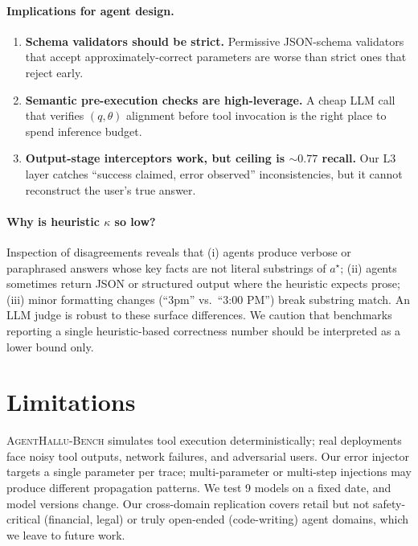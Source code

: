 \documentclass[11pt]{article}
\newcommand{\halluben}{\textsc{AgentHallu-Bench}}
\begin{document}
\paragraph{Implications for agent design.}
\begin{enumerate}
  \item \textbf{Schema validators should be strict.} Permissive JSON-schema validators that accept approximately-correct parameters are worse than strict ones that reject early.
  \item \textbf{Semantic pre-execution checks are high-leverage.} A cheap LLM call that verifies $(q, \theta)$ alignment before tool invocation is the right place to spend inference budget.
  \item \textbf{Output-stage interceptors work, but ceiling is $\sim\!0.77$ recall.} Our L3 layer catches ``success claimed, error observed'' inconsistencies, but it cannot reconstruct the user's true answer.
\end{enumerate}

\paragraph{Why is heuristic $\kappa$ so low?}
Inspection of disagreements reveals that (i) agents produce verbose or paraphrased answers whose key facts are not literal substrings of $a^\star$; (ii) agents sometimes return JSON or structured output where the heuristic expects prose; (iii) minor formatting changes (``3pm'' vs.\ ``3:00 PM'') break substring match. An LLM judge is robust to these surface differences. We caution that benchmarks reporting a single heuristic-based correctness number should be interpreted as a lower bound only.

\section{Limitations}

\halluben{} simulates tool execution deterministically; real deployments face noisy tool outputs, network failures, and adversarial users. Our error injector targets a single parameter per trace; multi-parameter or multi-step injections may produce different propagation patterns. We test 9 models on a fixed date, and model versions change. Our cross-domain replication covers retail but not safety-critical (financial, legal) or truly open-ended (code-writing) agent domains, which we leave to future work.
\end{document}
